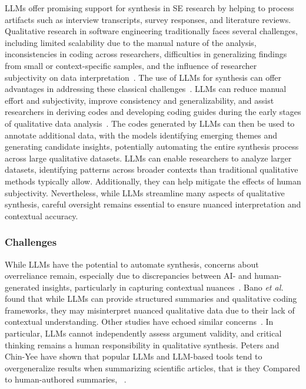 LLMs offer promising support for synthesis in SE research by helping to process artifacts such as interview transcripts, survey responses, and literature reviews.
Qualitative research in software engineering traditionally faces several challenges, including limited scalability due to the manual nature of the analysis, inconsistencies in coding across researchers, difficulties in generalizing findings from small or context-specific samples, and the influence of researcher subjectivity on data interpretation~\cite{DBLP:journals/ase/BanoHZT24}. 
The use of LLMs for synthesis can offer advantages in addressing these classical challenges~\cite{DBLP:journals/ase/BanoHZT24, barros2024largelanguagemodelqualitative, leça2024applicationsimplicationslargelanguage}.
LLMs can reduce manual effort and subjectivity, improve consistency and generalizability, and assist researchers in deriving codes and developing coding guides during the early stages of qualitative data analysis~\cite{DBLP:conf/chi/ByunVS23,DBLP:journals/ase/BanoHZT24}. The codes generated by LLMs can then be used to annotate additional data, with the models identifying emerging themes and generating candidate insights, potentially automating the entire synthesis process across large qualitative datasets.
LLMs can enable researchers to analyze larger datasets, identifying patterns across broader contexts than traditional qualitative methods typically allow. Additionally, they can help mitigate the effects of human subjectivity. Nevertheless, while LLMs streamline many aspects of qualitative synthesis, careful oversight remains essential to ensure nuanced interpretation and contextual accuracy.

\subsubsection{Challenges}

While LLMs have the potential to automate synthesis, concerns about overreliance remain, especially due to discrepancies between AI- and human-generated insights, particularly in capturing contextual nuances~\cite{bano2023exploringqualitativeresearchusing}.
Bano \textit{et al.}~\cite{bano2023exploringqualitativeresearchusing} found that while LLMs can provide structured summaries and qualitative coding frameworks, they may misinterpret nuanced qualitative data due to their lack of contextual understanding. Other studies have echoed similar concerns~\cite{DBLP:journals/ase/BanoHZT24, barros2024largelanguagemodelqualitative, leça2024applicationsimplicationslargelanguage}. In particular, LLMs cannot independently assess argument validity, and critical thinking remains a human responsibility in qualitative synthesis.
Peters and Chin-Yee have shown that popular LLMs and LLM-based tools tend to overgeneralize results when summarizing scientific articles, that is they  Compared to human-authored summaries, ~\cite{peterschineyee2025generalizationbias}.

